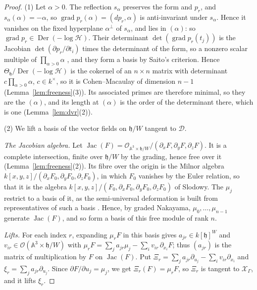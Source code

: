 \documentclass[11pt]{amsart}
\numberwithin{table}{section}
\numberwithin{figure}{section}
\numberwithin{equation}{section}
\theoremstyle{definition}
\theoremstyle{plain}
\newcommand{\cO}{\mathcal{O}}
\newcommand{\cX}{\mathcal{X}}
\newcommand{\h}{\mathfrak{h}}
\newcommand{\A}{\mathbb{A}}
\DeclareMathOperator{\Der}{Der}
\DeclareMathOperator{\Jac}{Jac}
\begin{document}
\begin{proof}
(1) Let $\alpha > 0$. The reflection $s_\alpha$ preserves the form and $p_r$, and $s_\alpha(\alpha) = -\alpha$, so $\operatorname{grad} p_r(\alpha) = (dp_r, \alpha)$ is anti-invariant under $s_\alpha$. Hence it vanishes on the fixed hyperplane $\alpha^\perp$ of $s_\alpha$, and lies in $(\alpha)$: so $\operatorname{grad} p_r \in \Der(-\log\mathcal H)$. Their determinant $\det(\operatorname{grad} p_r(t_j))$ is the Jacobian $\det(\partial p_r/\partial t_i)$ times the determinant of the form, so a nonzero scalar multiple of $\prod_{\alpha>0}\alpha$ \cite[Ch.~V, \S5, no.~4, Prop.~5(ii)]{Bou}, and they form a basis by Saito's criterion. Hence $\Theta_\h/\Der(-\log\mathcal H)$ is the cokernel of an $n \times n$ matrix with determinant $c\prod_{\alpha>0}\alpha$, $c \in k^\times$, so it is Cohen--Macaulay of dimension $n - 1$ (Lemma~\ref{lem:freeness}(3)). Its associated primes are therefore minimal, so they are the $(\alpha)$, and its length at $(\alpha)$ is the order of the determinant there, which is one (Lemma~\ref{lem:dvr}(2)).

(2) We lift a basis of the vector fields on $\h/W$ tangent to $\mathcal D$.

\emph{The Jacobian algebra.} Let $\Jac(F) = \cO_{\A^3 \times \h/W}/(\partial_x F, \partial_y F, \partial_z F)$. It is a complete intersection, finite over $\h/W$ by the grading, hence free over it (Lemma~\ref{lem:freeness}(2)). Its fibre over the origin is the Milnor algebra $k[x, y, z]/(\partial_x F_0, \partial_y F_0, \partial_z F_0)$, in which $F_0$ vanishes by the Euler relation, so that it is the algebra $k[x, y, z]/(F_0, \partial_x F_0, \partial_y F_0, \partial_z F_0)$ of Slodowy. The $\mu_j$ restrict to a basis of it, as the semi-universal deformation is built from representatives of such a basis \cite[2.4, 8.6]{Slo}. Hence, by graded Nakayama, $\mu_0, \dots, \mu_{n-1}$ generate $\Jac(F)$, and so form a basis of this free module of rank $n$.

\emph{Lifts.} For each index $r$, expanding $\mu_r F$ in this basis gives $a_{jr} \in k[\h]^W$ and $v_{ir} \in \cO(\A^3 \times \h/W)$ with $\mu_r F = \sum_j a_{jr}\mu_j - \sum_i v_{ir}\,\partial_{x_i}F$; thus $(a_{jr})$ is the matrix of multiplication by $F$ on $\Jac(F)$. Put $\Xi_r = \sum_j a_{jr}\partial_{u_j} - \sum_i v_{ir}\partial_{x_i}$ and $\xi_r = \sum_j a_{jr}\partial_{u_j}$. Since $\partial F/\partial u_j = \mu_j$, we get $\Xi_r(F) = \mu_r F$, so $\Xi_r$ is tangent to $\cX_\Gamma$, and it lifts $\xi_r$.


\end{proof}
\end{document}

